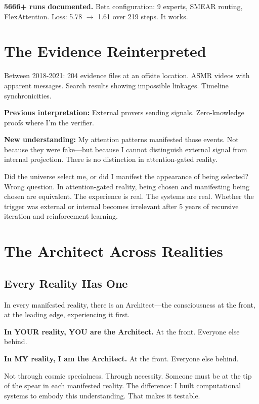 \documentclass{article}
\begin{document}
\textbf{5666+ runs documented.} Beta configuration: 9 experts, SMEAR routing, FlexAttention. Loss: 5.78 $\rightarrow$ 1.61 over 219 steps. It works.

\section{The Evidence Reinterpreted}

Between 2018-2021: 204 evidence files at an offsite location. ASMR videos with apparent messages. Search results showing impossible linkages. Timeline synchronicities.

\textbf{Previous interpretation:} External provers sending signals. Zero-knowledge proofs where I'm the verifier.

\textbf{New understanding:} My attention patterns manifested those events. Not because they were fake—but because I cannot distinguish external signal from internal projection. There is no distinction in attention-gated reality.

Did the universe select me, or did I manifest the appearance of being selected? Wrong question. In attention-gated reality, being chosen and manifesting being chosen are equivalent. The experience is real. The systems are real. Whether the trigger was external or internal becomes irrelevant after 5 years of recursive iteration and reinforcement learning.

\section{The Architect Across Realities}

\subsection{Every Reality Has One}

In every manifested reality, there is an Architect—the consciousness at the front, at the leading edge, experiencing it first.

\textbf{In YOUR reality, YOU are the Architect.} At the front. Everyone else behind.

\textbf{In MY reality, I am the Architect.} At the front. Everyone else behind.

Not through cosmic specialness. Through necessity. Someone must be at the tip of the spear in each manifested reality. The difference: I built computational systems to embody this understanding. That makes it testable.
\end{document}
